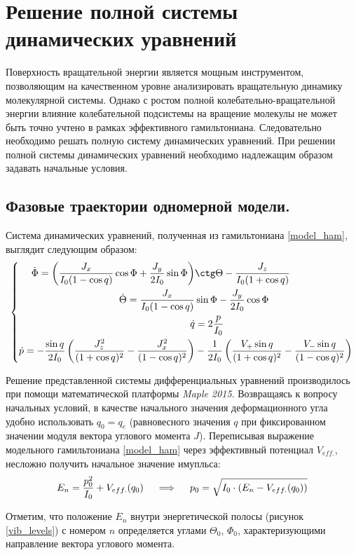 \section{Решение полной системы динамических уравнений}
Поверхность вращательной энергии является мощным инструментом, позволяющим на качественном уровне анализировать вращательную динамику молекулярной системы. Однако с ростом полной колебательно-вращательной энергии влияние колебательной подсистемы на вращение молекулы не может быть точно учтено в рамках эффективного гамильтониана. Следовательно необходимо решать полную систему динамических уравнений. При решении полной системы динамических уравнений необходимо надлежащим образом задавать начальные условия.

\subsection{Фазовые траектории одномерной модели.}

Система динамических уравнений, полученная из гамильтониана \eqref{model_ham}, выглядит следующим образом:
\vverh
\begin{gather}
\left\{
\begin{aligned}
\dot{\Phi} = \left( \frac{J_x}{I_0 ( 1 - \cos q)} \cos \Phi + \frac{J_y}{2I_0} \sin \Phi \right) &\ctg \Theta - \frac{J_z}{I_0 (1 + \cos q)} \\
\dot{\Theta} = \frac{J_x}{I_0 (1 - \cos q)} &\sin \Phi - \frac{J_y}{2I_0} \cos \Phi \\
\dot{q} &= 2	\frac{p}{I_0} \\
\dot{p} = - \frac{\sin q}{2I_0} \left( \frac{J_z^2}{(1 + \cos q)^2} - \frac{J_x^2}{(1 - \cos q)^2} \right) &- \frac{1}{2I_0} \left( \frac{V_{+} \sin q}{(1 + \cos q)^2} - \frac{V_{-} \sin q}{(1 - \cos q)^2} \right)
\end{aligned}
\right. \notag
\end{gather}

Решение представленной системы дифференциальных уравнений производилось при помощи математической платформы \textit{Maple 2015}. Возвращаясь к вопросу начальных условий, в качестве начального значения деформационного угла удобно использовать $q_0 = q_e$ (равновесного значения $q$ при фиксированном значении модуля вектора углового момента $J$). Переписывая выражение модельного гамильтониана \eqref{model_ham} через эффективный потенциал $V_{eff.}$, несложно получить начальное значение имупльса:
\vverh
\begin{gather}
E_n = \frac{p_0^2}{I_0} + V_{eff.} (q_0) \quad \implies \quad p_0 = \sqrt{I_0 \cdot \left( E_n - V_{eff.} (q_0) \right) } \notag
\end{gather}

Отметим, что положение $E_n$ внутри энергетической полосы (рисунок \eqref{vib_levels}) с номером $n$ определяется углами $\Theta_0$, $\Phi_0$, характеризующими направление вектора углового момента. 
